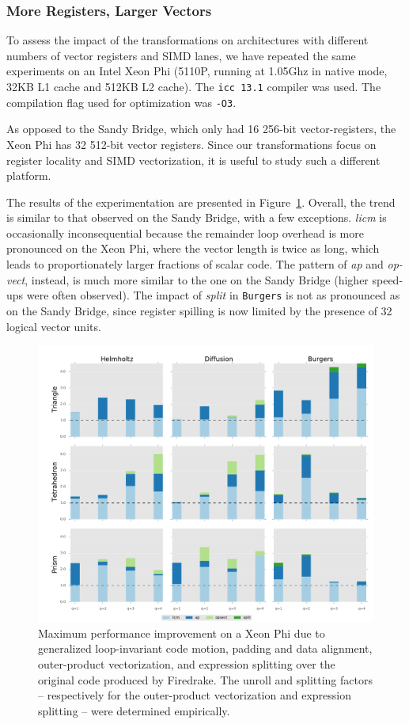 \subsubsection{More Registers, Larger Vectors}
To assess the impact of the transformations on architectures with different numbers of vector registers and SIMD lanes, we have repeated the same experiments on an Intel Xeon Phi (5110P, running at 1.05Ghz in native mode, 32KB L1 cache and 512KB L2 cache). The \texttt{icc 13.1} compiler was used. The compilation flag used for optimization was \texttt{-O3}. 

As opposed to the Sandy Bridge, which only had 16 256-bit vector-registers, the Xeon Phi has 32 512-bit vector registers. Since our transformations focus on register locality and SIMD vectorization, it is useful to study such a different platform. 

The results of the experimentation are presented in Figure~\ref{fig:coffee-individual-res-phi}. Overall, the trend is similar to that observed on the Sandy Bridge, with a few exceptions. {\em licm} is occasionally inconsequential because the remainder loop overhead is more pronounced on the Xeon Phi, where the vector length is twice as long, which leads to proportionately larger fractions of scalar code. The pattern of {\em ap} and {\em op-vect}, instead, is much more similar to the one on the Sandy Bridge (higher speed-ups were often observed). The impact of {\em split} in {\tt Burgers} is not as pronounced as on the Sandy Bridge, since register spilling is now limited by the presence of 32 logical vector units. 

\begin{figure}[t]
\centerline{\includegraphics[scale=0.45]{lowlevelopt/perf-results/individual/plot_phi}}
\caption{Maximum performance improvement on a Xeon Phi due to generalized loop-invariant code motion, padding and data alignment, outer-product vectorization, and expression splitting over the original code produced by Firedrake. The unroll and splitting factors -- respectively for the outer-product vectorization and expression splitting -- were determined empirically.}
\label{fig:coffee-individual-res-phi}
\end{figure}


